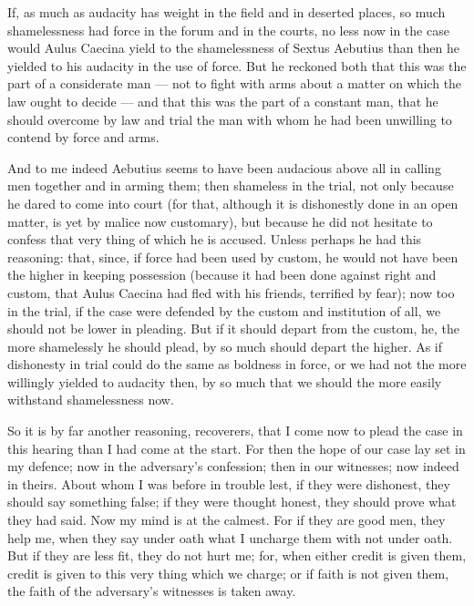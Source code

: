 %

 If, as much as audacity has weight in the field and in deserted places, so much shamelessness had force in the forum and in the courts, no less now in the case would Aulus Caecina yield to the shamelessness of Sextus Aebutius than then he yielded to his audacity in the use of force. But he reckoned both that this was the part of a considerate man --- not to fight with arms about a matter on which the law ought to decide --- and that this was the part of a constant man, that he should overcome by law and trial the man with whom he had been unwilling to contend by force and arms.

 And to me indeed Aebutius seems to have been audacious above all in calling men together and in arming them; then shameless in the trial, not only because he dared to come into court (for that, although it is dishonestly done in an open matter, is yet by malice now customary), but because he did not hesitate to confess that very thing of which he is accused. Unless perhaps he had this reasoning: that, since, if force had been used by custom, he would not have been the higher in keeping possession (because it had been done against right and custom, that Aulus Caecina had fled with his friends, terrified by fear); now too in the trial, if the case were defended by the custom and institution of all, we should not be lower in pleading. But if it should depart from the custom, he, the more shamelessly he should plead, by so much should depart the higher. As if dishonesty in trial could do the same as boldness in force, or we had not the more willingly yielded to audacity then, by so much that we should the more easily withstand shamelessness now.

 So it is by far another reasoning, recoverers, that I come now to plead the case in this hearing than I had come at the start. For then the hope of our case lay set in my defence; now in the adversary's confession; then in our witnesses; now indeed in theirs. About whom I was before in trouble lest, if they were dishonest, they should say something false; if they were thought honest, they should prove what they had said. Now my mind is at the calmest. For if they are good men, they help me, when they say under oath what I uncharge them with not under oath. But if they are less fit, they do not hurt me; for, when either credit is given them, credit is given to this very thing which we charge; or if faith is not given them, the faith of the adversary's witnesses is taken away.

